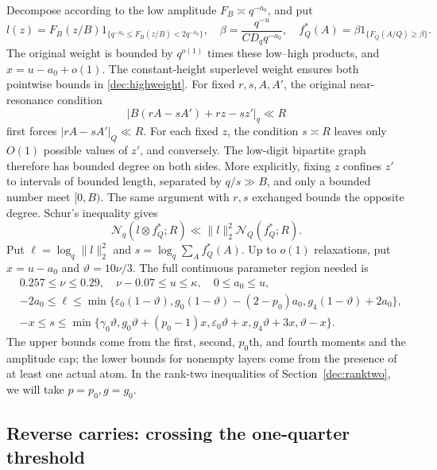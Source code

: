 \documentclass[11pt,a4paper]{article}
\theoremstyle{paperplain}
\numberwithin{equation}{section}
\begin{document}
Decompose according to the low amplitude $F_B\asymp q^{-a_0}$, and put
\[
 l(z)=F_B(z/B)1_{\{q^{-a_0}\le F_B(z/B)<2q^{-a_0}\}},
 \quad \beta=\frac{q^{-u}}{C D_qq^{-a_0}},
 \quad f_Q^*(A)=\beta1_{\{F_Q(A/Q)\ge\beta\}}.
\]
The original weight is bounded by $q^{o(1)}$ times these low--high
products, and $x=u-a_0+o(1)$. The constant-height superlevel weight
ensures both pointwise bounds in \eqref{dec:highweight}.
For fixed $r,s,A,A'$, the original near-resonance condition
\[
 |B(rA-sA')+rz-sz'|_q\ll R
\]
first forces $|rA-sA'|_Q\ll R$. For each fixed $z$, the condition
$s\asymp R$ leaves only $O(1)$ possible values of $z'$, and conversely.
The low-digit bipartite graph therefore has bounded degree on both sides.
More explicitly, fixing $z$ confines $z'$ to intervals of bounded
length, separated by $q/s\gg B$, and only a bounded number meet
$[0,B)$. The same argument with $r,s$ exchanged bounds the opposite
degree. Schur's inequality gives
\begin{equation}\label{dec:forwardcarry}
 \mathcal N_q(l\otimes f_Q^*;R)
 \ll\|l\|_2^2\mathcal N_Q(f_Q^*;R).
\end{equation}
Put $\ell=\log_q\|l\|_2^2$ and $s=\log_q\sum_Af_Q^*(A)$.
Up to $o(1)$ relaxations, put $x=u-a_0$ and $\vartheta=10\nu/3$.
The full continuous parameter region needed is
\begin{align}
 &0.257\le\nu\le0.29,\quad \nu-0.07\le u\le\kappa,
 \quad 0\le a_0\le u,
 \label{dec:forwardregion}\\
 &-2a_0\le\ell\le\min\{\varepsilon_0(1-\vartheta),
        g_0(1-\vartheta)-(2-p_0)a_0,
        g_4(1-\vartheta)+2a_0\},\label{dec:lowconstraints}\\
 &-x\le s\le\min\{\gamma_0\vartheta,
        g_0\vartheta+(p_0-1)x,
        \varepsilon_0\vartheta+x,
        g_4\vartheta+3x,
        \vartheta-x\}.\label{dec:highconstraints}
\end{align}
The upper bounds come from the first, second, $p_0$th, and fourth
moments and the amplitude cap; the lower bounds for nonempty layers
come from the presence of at least one actual atom.
In the rank-two inequalities of Section~\ref{dec:ranktwo}, we will
take $p=p_0,g=g_0$.

\subsection{Reverse carries: crossing the one-quarter threshold}
\label{dec:reverse}
\end{document}
